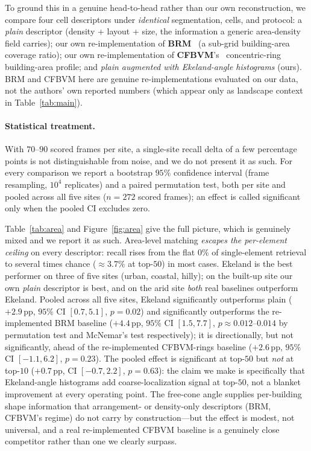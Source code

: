 \documentclass[10pt]{article}
\theoremstyle{plain}
\theoremstyle{definition}
\begin{document}
To ground this in a genuine head-to-head rather than our own reconstruction,
we compare four cell descriptors under \emph{identical} segmentation, cells,
and protocol: a \emph{plain} descriptor (density + layout + size, the
information a generic area-density field carries); our own re-implementation
of \textbf{BRM}~\cite{choi2020brm} (a sub-grid building-area coverage ratio);
our own re-implementation of \textbf{CFBVM}'s~\cite{ouyang2024cfbvm}
concentric-ring building-area profile; and \emph{plain augmented with
Ekeland-angle histograms} (ours). BRM and CFBVM here are genuine
re-implementations evaluated on our data, not the authors' own reported
numbers (which appear only as landscape context in Table~\ref{tab:main}).

\paragraph{Statistical treatment.} With $70$--$90$ scored frames per site,
a single-site recall delta of a few percentage points is not distinguishable
from noise, and we do not present it as such. For every comparison we report
a bootstrap $95\%$ confidence interval (frame resampling, $10^4$ replicates)
and a paired permutation test, both per site and pooled across all five
sites ($n=272$ scored frames); an effect is called significant only when the
pooled CI excludes zero.

Table~\ref{tab:area} and Figure~\ref{fig:area} give the full picture, which
is genuinely mixed and we report it as such. Area-level matching
\emph{escapes the per-element ceiling} on every descriptor: recall rises from
the flat $0\%$ of single-element retrieval to several times chance
($\approx3.7\%$ at top-$50$) in most cases. Ekeland is the best performer on
three of five sites (urban, coastal, hilly); on the built-up site our own
\emph{plain} descriptor is best, and on the arid site \emph{both} real
baselines outperform Ekeland. Pooled across all five sites, Ekeland
significantly outperforms plain ($+2.9$\,pp, $95\%$ CI $[0.7,5.1]$,
$p{=}0.02$) and significantly outperforms the re-implemented BRM baseline
($+4.4$\,pp, $95\%$ CI $[1.5,7.7]$, $p{\approx}0.012$--$0.014$ by permutation
test and McNemar's test respectively); it is directionally, but not
significantly, ahead of the re-implemented CFBVM-rings baseline ($+2.6$\,pp,
$95\%$ CI $[{-}1.1,6.2]$, $p{=}0.23$). The pooled effect is significant at
top-$50$ but \emph{not} at top-$10$ ($+0.7$\,pp, CI $[{-}0.7,2.2]$,
$p{=}0.63$): the claim we make is specifically that Ekeland-angle histograms
add coarse-localization signal at top-$50$, not a blanket improvement at
every operating point. The free-cone angle supplies per-building shape
information that arrangement- or density-only descriptors (BRM, CFBVM's
regime) do not carry by construction---but the effect is modest, not
universal, and a real re-implemented CFBVM baseline is a genuinely close
competitor rather than one we clearly surpass.
\end{document}

